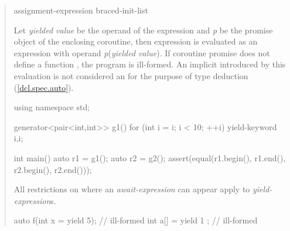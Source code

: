 \begin{quote}
\begin{bnf}
  \br
   assignment-expression\br
   braced-init-list
\end{bnf}

\pnum
  Let \textit{yielded value} be the operand of the  expression and \textit{p} be the promise object of the enclosing coroutine, then  expression is evaluated as an  expression with operand \textit{p}(\textit{yielded value}). If coroutine promise does not define a function , the program is ill-formed.
 An implicit  introduced by this evaluation is not considered an  for the purpose of type deduction (\ref{dcl.spec.auto}). 

\pnum
\enterexample
\begin{codeblock}
using namespace std;
  
generator<pair<int,int>> g1() {
  for (int i = i; i < 10; ++i)
    yield-keyword {i,i};
}

int main() {
  auto r1 = g1();
  auto r2 = g2();
  assert(equal(r1.begin(), r1.end(), r2.begin(), r2.end()));
}
\end{codeblock}
\exitexample

\pnum
All restrictions on where an \textit{await-expression} can appear apply to \textit{yield-expression}{}s.

\enterexample
\begin{codeblock}
  auto f(int x = yield 5); // ill-formed
  int a[] = { yield 1 }; // ill-formed
\end{codeblock}
\exitexample


\end{quote}

